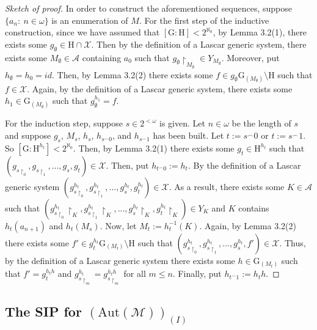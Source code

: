\documentclass[11pt]{article}
\theoremstyle{plain}
\theoremstyle{definition}
\newcommand{\M}{\mathcal{M}}
\newcommand{\G}{\mathrm{G}}
\newcommand{\A}{\mathrm{Aut}}
\begin{document}
\begin{proof}[Sketch of proof]
In order to construct the  aforementioned sequences, suppose $\{a_{n}: \ n\in\omega\}$ is an enumeration of $M$.
For the first step of the inductive construction, since we have assumed that ${[\G:\mathrm{H}]<2^{\aleph_{0}}}$, by Lemma 3.2(1), there exists some $g_{\emptyset}\in\mathrm{H}\cap\mathcal{X}$. Then by the definition of a Lascar generic system, there exists some $M_{\emptyset}\in \mathcal{A}$ containing $a_{0}$ such that $g_{\emptyset}\upharpoonright_{M_{\emptyset}}\in Y_{M_{\emptyset}}$. Moreover, put $h_{\emptyset}=h_{0}=id$. Then, by Lemma 3.2(2) there exists some $f\in g_{\emptyset}\G_{(M_{\emptyset})}\setminus \mathrm{H}$ such that $f\in\mathcal{X}$. Again, by the definition of a Lascar generic system, there exists some $h_{1}\in\G_{(M_{\emptyset})}$ such that $g_{\emptyset}^{h_{1}}=f$.

For the induction step, suppose $s\in 2^{<\omega}$  is given. Let $n\in\omega$ be the length of $s$  and suppose $g_{s}$,  $M_{s}$, $h_{s}$, $h_{s^{\smallfrown}0}$, and $h_{s^{\smallfrown}1}$ has been built. Let $t:=s^{\smallfrown}0$ or $t:=s^{\smallfrown}1$. So $[\G:\mathrm{H}^{h_{t}}]<2^{\aleph_{0}}$. Then, by Lemma 3.2(1) there exists some $g_{t}\in \mathrm{H}^{h_{t}}$ such that ${(g_{s\upharpoonright_{0}},g_{s\upharpoonright_{1}},...,g_{s},g_{t})\in\mathcal{X}}$. Then, put ${h_{t^{\smallfrown}0}:=h_{t}}$. By the definition of a Lascar generic system $(g^{h_{t}}_{s\upharpoonright_{0}},g^{h_{t}}_{s\upharpoonright_{1}},...,g^{h_{t}}_{s},g_{t}^{h_{t}})\in\mathcal{X} $. As a result, there exists some $K\in\mathcal{A}$  such that ${(g^{h_{t}}_{s\upharpoonright_{0}}\upharpoonright_{K},g^{h_{t}}_{s\upharpoonright_{1}}\upharpoonright_{K},...,g^{h_{t}}_{s}\upharpoonright_{K},g_{t}^{h_{t}}\upharpoonright_{K})\in Y_{K}} $ and $K$ contains $h_{t}(a_{n+1})$ and $h_{t}(M_{s})$.  Now, let $M_{t}:=h_{t}^{-1}(K)$. Again, by Lemma 3.2(2) there exists some $f'\in g_{t}^{h_{t}}\G_{(M_{t})}\setminus\mathrm{H}$ such that $ (g^{h_{t}}_{s\upharpoonright_{0}},g^{h_{t}}_{s\upharpoonright_{1}},...,g^{h_{t}}_{s},f')\in\mathcal{X}$. Thus, by the definition of a Lascar generic system there exists some $h\in\G_{(M_{t})}$ such that $f'=g_{t}^{h_{t}h}$ and $g_{s\upharpoonright_{m}}^{h_{t}}=g_{s\upharpoonright_{m}}^{h_{t}h}$ for all $m\leq n$. Finally, put $h_{t^{\smallfrown}1}:=h_{t}h$.
\end{proof}



\subsection{The SIP for $(\A(\M))_{(I)}$}
\end{document}
